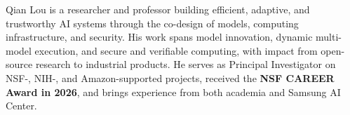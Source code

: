 Qian Lou is a researcher and professor building efficient, adaptive, and trustworthy AI systems through the co-design of models, computing infrastructure, and security. His work spans model innovation, dynamic multi-model execution, and secure and verifiable computing, with impact from open-source research to industrial products. He serves as Principal Investigator on NSF-, NIH-, and Amazon-supported projects, received the \textbf{NSF CAREER Award in 2026}, and brings experience from both academia and Samsung AI Center.
